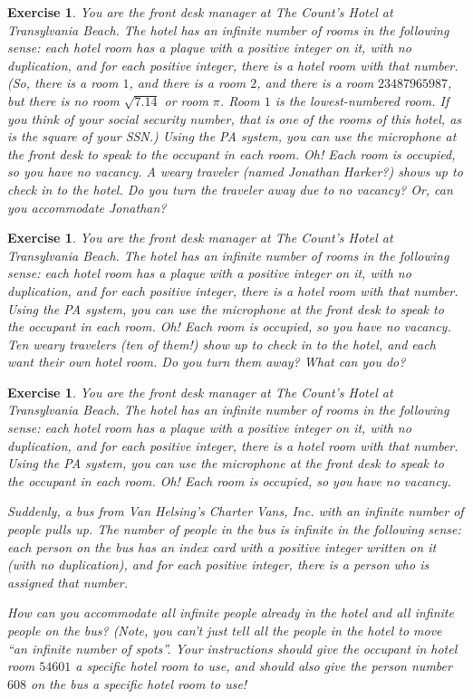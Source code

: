 \documentclass{book}
\newcounter{ekcounter}%
\theoremstyle{ekimcustom}
\newtheorem{exercise}[ekcounter]{Exercise}
\begin{document}
\begin{exercise}
You are the front desk manager at The Count's Hotel at Transylvania Beach. The hotel has an infinite number of rooms in the following sense: each hotel room has a plaque with a positive integer on it, with no duplication, and for each positive integer, there is a hotel room with that number. (So, there is a room $1$, and there is a room $2$, and there is a room $23487965987$, but there is no room $\sqrt{7.14}$ or room $\pi$. Room $1$ is the lowest-numbered room. If you think of your social security number, that is one of the rooms of this hotel, as is the square of your SSN.) Using the PA system, you can use the microphone at the front desk to speak to the occupant in each room. Oh! Each room is occupied, so you have no vacancy. A weary traveler (named Jonathan Harker?) shows up to check in to the hotel. Do you turn the traveler away due to no vacancy? Or, can you accommodate Jonathan?
\end{exercise}

\begin{exercise}
You are the front desk manager at The Count's Hotel at Transylvania Beach. The hotel has an infinite number of rooms in the following sense: each hotel room has a plaque with a positive integer on it, with no duplication, and for each positive integer, there is a hotel room with that number. Using the PA system, you can use the microphone at the front desk to speak to the occupant in each room. Oh! Each room is occupied, so you have no vacancy. Ten weary travelers (ten of them!) show up to check in to the hotel, and each want their own hotel room. Do you turn them away? What can you do?
\end{exercise}

\begin{exercise}
You are the front desk manager at The Count's Hotel at Transylvania Beach. The hotel has an infinite number of rooms in the following sense: each hotel room has a plaque with a positive integer on it, with no duplication, and for each positive integer, there is a hotel room with that number. Using the PA system, you can use the microphone at the front desk to speak to the occupant in each room. Oh! Each room is occupied, so you have no vacancy. 

Suddenly, a bus from Van Helsing's Charter Vans, Inc. with an infinite number of people pulls up. The number of people in the bus is infinite in the following sense: each person on the bus has an index card with a positive integer written on it (with no duplication), and for each positive integer, there is a person who is assigned that number.

How can you accommodate all infinite people already in the hotel and all infinite people on the bus? (Note, you can't just tell all the people in the hotel to move ``an infinite number of spots''. Your instructions should give the occupant in hotel room $54601$ a specific hotel room to use, and should also give the person number $608$ on the bus a specific hotel room to use!
\end{exercise}
\end{document}
